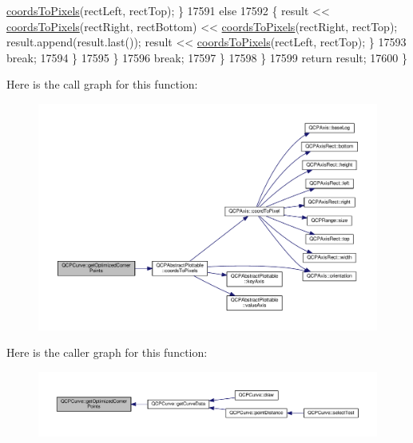 \begin{DoxyCode}
      \hyperlink{class_q_c_p_abstract_plottable_ade710a776104b14c1c835168ce1bfc5c}{coordsToPixels}(rectLeft, rectTop); \}
17591           \textcolor{keywordflow}{else}
17592           \{ result << \hyperlink{class_q_c_p_abstract_plottable_ade710a776104b14c1c835168ce1bfc5c}{coordsToPixels}(rectRight, rectBottom) << 
      \hyperlink{class_q_c_p_abstract_plottable_ade710a776104b14c1c835168ce1bfc5c}{coordsToPixels}(rectRight, rectTop); result.append(result.last()); result << 
      \hyperlink{class_q_c_p_abstract_plottable_ade710a776104b14c1c835168ce1bfc5c}{coordsToPixels}(rectLeft, rectTop); \}
17593           \textcolor{keywordflow}{break};
17594         \}
17595       \}
17596       \textcolor{keywordflow}{break};
17597     \}
17598   \}
17599   \textcolor{keywordflow}{return} result;
17600 \}
\end{DoxyCode}


Here is the call graph for this function\+:\nopagebreak
\begin{figure}[H]
\begin{center}
\leavevmode
\includegraphics[width=350pt]{class_q_c_p_curve_aad0b69d9a7a2a5367fcc9fe3edaf9bf4_cgraph}
\end{center}
\end{figure}




Here is the caller graph for this function\+:\nopagebreak
\begin{figure}[H]
\begin{center}
\leavevmode
\includegraphics[width=350pt]{class_q_c_p_curve_aad0b69d9a7a2a5367fcc9fe3edaf9bf4_icgraph}
\end{center}
\end{figure}


